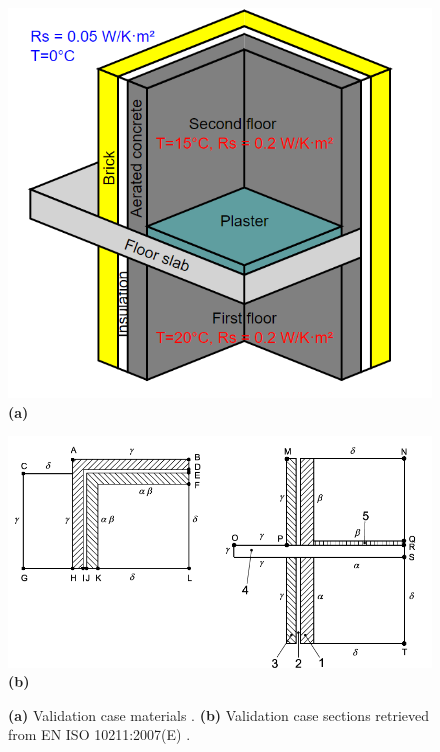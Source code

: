 \begin{figure}[h!]
    \centering
    \begin{minipage}[t]{0.54\columnwidth}
        \centering
        \includegraphics[width=\linewidth]{Figures/validationcase}
        \textbf{(a)}
    \end{minipage}
    \hfill
    \begin{minipage}[t]{0.8\linewidth}
        \centering
        \includegraphics[width=\linewidth]{Figures/isodesc.png}
        \textbf{(b)}
    \end{minipage}
    
    \caption[3D Validation Materials]{\textbf{(a)} Validation case materials \cite{ISO}. \textbf{(b)}  Validation case sections retrieved from \gls{EN} ISO 10211:2007(E) \cite{ISO}.}
    \label{fig:validation-case-materials}
\end{figure}









